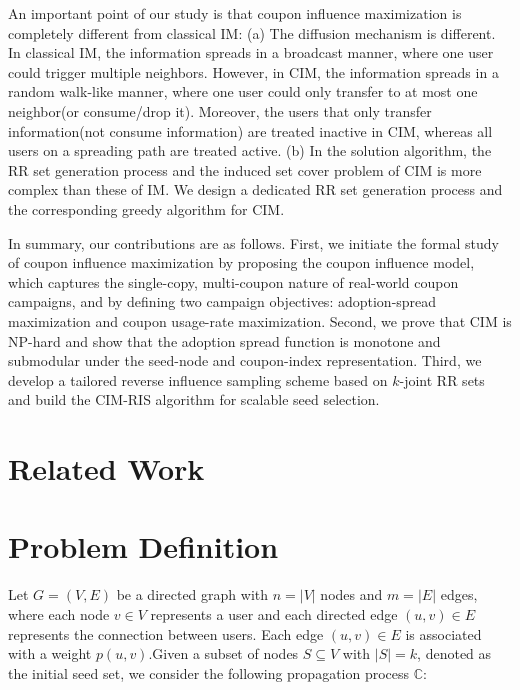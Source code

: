 \documentclass[sigconf]{acmart}
\newcommand{\CIMRIS}{\textsc{CIM-RIS}}
\begin{document}
An important point of our study is that coupon influence maximization is
completely different from classical IM:
(a) The diffusion mechanism is different. In classical IM, the information spreads in a broadcast manner, where one user could trigger multiple neighbors. However, in CIM, the information spreads in a random walk-like manner, where one user could only transfer to at most one neighbor(or consume/drop it). Moreover, the users that only transfer information(not consume information) are treated inactive in CIM, whereas all users on a spreading path are treated active. (b) In the solution algorithm, the RR set generation process and the induced set cover problem of CIM is more complex than these of IM. 
We design a dedicated RR set generation process and the corresponding greedy algorithm for CIM.


In summary, our contributions are as follows.
First, we initiate the formal study of coupon influence maximization by
proposing the coupon influence model, which captures the single-copy,
multi-coupon nature of real-world coupon campaigns, and by defining two
campaign objectives: adoption-spread maximization and coupon
usage-rate maximization.
Second, we prove that CIM is NP-hard and show that the adoption spread
function is monotone and submodular under the seed-node and coupon-index
representation.
Third, we develop a tailored reverse influence sampling scheme based on
$k$-joint RR sets and build the \CIMRIS{} algorithm for scalable seed
selection.


\section{Related Work}
\label{sec:related}

\section{Problem Definition}
\label{sec:model}

Let $G=(V,E)$ be a directed graph with $n = |V|$ nodes and $m = |E|$ edges, where each node $v\in V$ represents a user and each directed edge $(u,v)\in E$ represents the connection between users. Each edge $(u,v)\in E$ is associated with a weight $p(u,v)$.Given a subset of nodes $S\subseteq V$ with $|S| = k$, denoted as the initial seed set, we consider the following propagation process $\mathbb{C}$:
\end{document}
